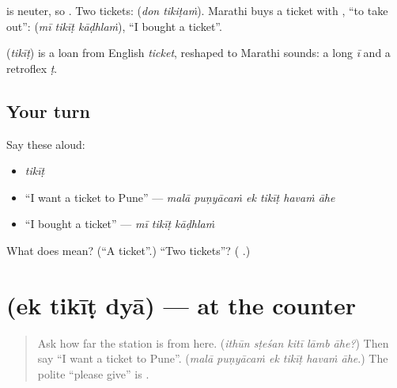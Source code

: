 \textbf{} is neuter, so \textbf{}. Two tickets: \textbf{ } (\emph{don tikiṭaṁ}). Marathi buys a ticket with \textbf{}, \textquotedblleft{}to take out\textquotedblright{}: \textbf{  } (\emph{mī tikīṭ kāḍhlaṁ}), \textquotedblleft{}I bought a ticket\textquotedblright{}.

\begin{cousinweb}
\textbf{} (\emph{tikīṭ}) is a loan from English \emph{ticket}, reshaped to Marathi sounds: a long \emph{ī} and a retroflex \emph{ṭ}.
\end{cousinweb}

\subsection*{Your turn}
Say these aloud:

\begin{itemize}
\raggedright
  \item \emph{tikīṭ}
  \item \textquotedblleft{}I want a ticket to Pune\textquotedblright{} — \emph{malā puṇyācaṁ ek tikīṭ havaṁ āhe}
  \item \textquotedblleft{}I bought a ticket\textquotedblright{} — \emph{mī tikīṭ kāḍhlaṁ}
\end{itemize}

\begin{tcolorbox}[breakable,colback=teal!4,colframe=teal!35!black,title={Before you move on}]
What does \textbf{} mean? (\textquotedblleft{}A ticket\textquotedblright{}.) \textquotedblleft{}Two tickets\textquotedblright{}? (\textbf{ }.)
\end{tcolorbox}
\section[\texorpdfstring{\mr{एक} \mr{तिकीट} \mr{द्या} (ek tikīṭ dyā)}{एक तिकीट द्या (ek tikīṭ dyā)}]{   (ek tikīṭ dyā) — at the counter}

\label{lesson:MR-C283-tikit-dya}



\begin{quote}
Ask how far the station is from here. (\emph{ithūn sṭeśan kitī lāmb āhe?}) Then say \textquotedblleft{}I want a ticket to Pune\textquotedblright{}. (\emph{malā puṇyācaṁ ek tikīṭ havaṁ āhe}.) The polite \textquotedblleft{}please give\textquotedblright{} is \textbf{}.
\end{quote}


